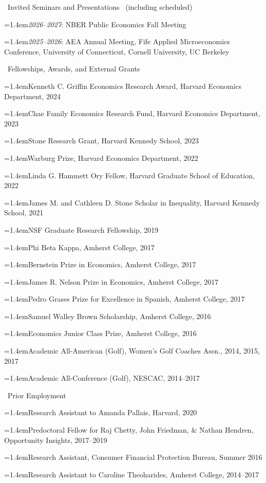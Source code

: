 \documentclass[11pt]{article}
\newcommand{\entryindent}{1.4em}  %
\newcommand{\cvsection}[1]{%
  \par\addvspace{12pt}%
  {\Large\textcolor{cvred}{\textemdash}\ #1}\par
  \nobreak\vspace{4pt}\nobreak}
\newcommand{\hang}{\hangindent=\entryindent\hangafter=1\relax}
\newcommand{\entrygap}{\par\addvspace{6pt}}
\begin{document}
\cvsection{Invited Seminars and Presentations%
  \ifed\ {\normalsize(including scheduled)}\fi}
\hang \textit{2026--2027}: NBER Public Economics Fall Meeting\entrygap
\hang \textit{2025--2026}: AEA Annual Meeting, Fife Applied Microeconomics Conference,
University of Connecticut, Cornell University, UC Berkeley\par

\cvsection{Fellowships, Awards, and External Grants}
\hang Kenneth C. Griffin Economics Research Award, Harvard Economics Department, 2024\par
\hang Chae Family Economics Research Fund, Harvard Economics Department, 2023\par
\hang Stone Research Grant, Harvard Kennedy School, 2023\par
\hang Warburg Prize, Harvard Economics Department, 2022\par
\hang Linda G. Hammett Ory Fellow, Harvard Graduate School of Education, 2022\par
\hang James M. and Cathleen D. Stone Scholar in Inequality, Harvard Kennedy School, 2021\par
\hang NSF Graduate Research Fellowship, 2019\par
\hang Phi Beta Kappa, Amherst College, 2017\par
\hang Bernstein Prize in Economics, Amherst College, 2017\par
\hang James R. Nelson Prize in Economics, Amherst College, 2017\par
\hang Pedro Grases Prize for Excellence in Spanish, Amherst College, 2017\par
\hang Samuel Walley Brown Scholarship, Amherst College, 2016\par
\hang Economics Junior Class Prize, Amherst College, 2016\par
\hang Academic All-American (Golf), Women's Golf Coaches Assn., 2014, 2015, 2017\par
\hang Academic All-Conference (Golf), NESCAC, 2014--2017\par

\cvsection{Prior Employment}
\hang Research Assistant to Amanda Pallais, Harvard, 2020\par
\hang Predoctoral Fellow for Raj Chetty, John Friedman, \& Nathan Hendren,
Opportunity Insights, 2017--2019\par
\hang Research Assistant, Consumer Financial Protection Bureau, Summer 2016\par
\hang Research Assistant to Caroline Theoharides, Amherst College, 2014--2017\par
\end{document}
